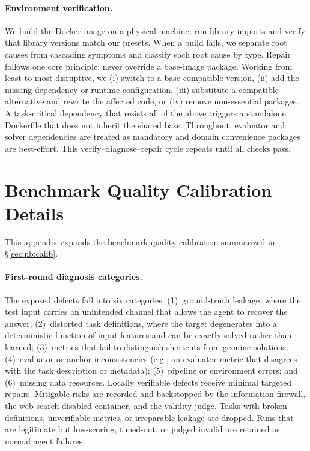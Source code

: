 \paragraph{Environment verification.}
We build the Docker image on a physical machine, run library imports and verify that library versions match our presets. When a build fails, we separate root causes from cascading symptoms and classify each root cause by type. Repair follows one core principle: never override a base-image package. Working from least to most disruptive, we (i) switch to a base-compatible version, (ii) add the missing dependency or runtime configuration, (iii) substitute a compatible alternative and rewrite the affected code, or (iv) remove non-essential packages. A task-critical dependency that resists all of the above triggers a standalone Dockerfile that does not inherit the shared base. Throughout, evaluator and solver dependencies are treated as mandatory and domain convenience packages are best-effort. This verify--diagnose--repair cycle repeats until all checks pass.

\section{Benchmark Quality Calibration Details}
\label{app:calibration-details}

This appendix expands the benchmark quality calibration summarized in \S\ref{sec:nb:calib}.

\paragraph{First-round diagnosis categories.}
The exposed defects fall into six categories: (1)~ground-truth leakage, where the test input carries an unintended channel that allows the agent to recover the answer; (2)~distorted task definitions, where the target degenerates into a deterministic function of input features and can be exactly solved rather than learned; (3)~metrics that fail to distinguish shortcuts from genuine solutions; (4)~evaluator or anchor inconsistencies (e.g., an evaluator metric that disagrees with the task description or metadata); (5)~pipeline or environment errors; and (6)~missing data resources.
Locally verifiable defects receive minimal targeted repairs. Mitigable risks are recorded and backstopped by the information firewall, the web-search-disabled container, and the validity judge. Tasks with broken definitions, unverifiable metrics, or irreparable leakage are dropped. Runs that are legitimate but low-scoring, timed-out, or judged invalid are retained as normal agent failures.

